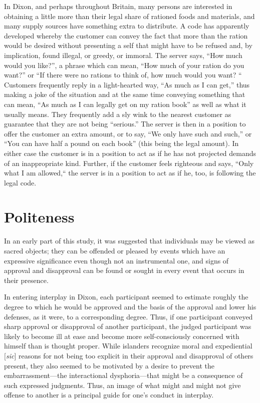 \documentclass[openany,nobib]{tufte-book}
\begin{document}
In Dixon, and perhaps throughout Britain, many persons are interested in
obtaining a little more than their legal share of rationed foods and
materials, and many supply sources have something extra to distribute. A
code has apparently developed whereby the customer can convey the fact
that more than the ration would be desired without presenting a self
that might have to be refused and, by implication, found illegal, or
greedy, or immoral. The server says, ``How much would you like?'', a
phrase which can mean, ``How much of your ration do you want?'' or ``If
there were no rations to think of, how much would you want? `` Customers
frequently reply in a light-hearted way, ``As much as I can get,'' thus
making a joke of the situation and at the same time conveying something
that can mean, ``As much as I can legally get on my ration book'' as
well as what it usually means. They frequently add a sly wink to the
nearest customer as guarantee that they are not being ``serious.'' The
server is then in a position to offer the customer an extra amount, or
to say, ``We only have such and such,'' or ``You can have half a pound
on each book'' (this being the legal amount). In either case the
customer is in a position to act as if he has not projected demands of
an inappropriate kind. Further, if the customer feels righteous and
says, ``Only what I am allowed,`` the server is in a position to act as
if he, too, is following the legal code.

\hypertarget{politeness}{%
\section{Politeness}\label{politeness}}

In an early part of this study, it was suggested that individuals may be
viewed as sacred objects; they can be offended or pleased by events
which have an expressive significance even though not an instrumental
one, and signs of approval and disapproval can be found or sought in
every event that occurs in their presence.

In entering interplay in Dixon, each participant seemed to estimate
roughly the degree to which he would be approved and the basis of the
approval and lower his defenses, as it were, to a corresponding degree.
Thus, if one participant conveyed sharp approval or disapproval of
another participant, the judged participant was likely to become ill at
ease and become more self-consciously concerned with himself than is
thought proper. While islanders recognize moral and expediential {[}\emph{sic}{]} reasons
for not being too explicit in their approval and disapproval of others
present, they also seemed to be motivated by a desire to prevent the
embarrassment---the interactional dysphoria---that might be a
consequence of such expressed judgments. Thus, an image of what might
and might not give offense to another is a principal guide for one's
conduct in interplay.
\end{document}
